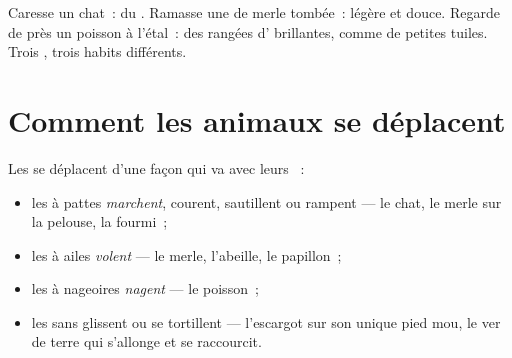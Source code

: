 \begin{example}\label{ex:g1:animals-around-us:covering}
Caresse un chat~: du . Ramasse une  de merle tombée~:
légère et douce. Regarde de près un poisson à l'étal~: des rangées
d' brillantes, comme de petites tuiles. Trois , trois
habits différents.
\end{example}

\section{Comment les animaux se déplacent}

\begin{proposition}\label{prop:g1:animals-around-us:moving}
Les  se déplacent d'une façon qui va avec leurs ~:
\begin{itemize}
  \item les  à pattes \emph{marchent}, courent, sautillent ou
        rampent --- le chat, le merle sur la pelouse, la fourmi~;
  \item les  à ailes \emph{volent} --- le merle,
        l'abeille, le papillon~;
  \item les  à nageoires \emph{nagent} --- le
        poisson~;
  \item les  sans  glissent ou se tortillent ---
        l'escargot sur son unique pied mou, le ver de terre qui
        s'allonge et se raccourcit.
\end{itemize}
\end{proposition}
\admitted

